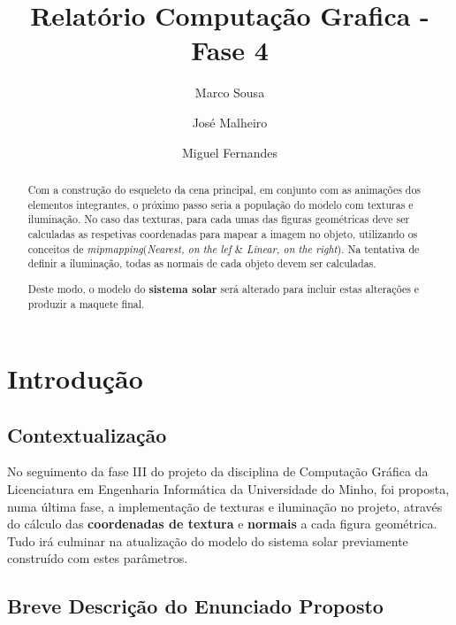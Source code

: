 \documentclass[runningheads]{llncs}
\begin{document}
%
\title{Relatório Computação Grafica - Fase 4}
\author{Marco Sousa \and
    José Malheiro \and
    Miguel Fernandes}
%
%
\maketitle              %
%
\begin{abstract}
    Com a construção do esqueleto da cena principal, em conjunto com as animações
    dos elementos integrantes, o próximo passo seria a população do modelo
    com texturas e iluminação.
    No caso das texturas, para cada umas das figuras geométricas deve ser 
    calculadas as respetivas coordenadas para mapear a imagem no objeto,
    utilizando os conceitos de \textit{mipmapping}(\textit{Nearest, on the lef} 
    \& \textit{Linear, on the right}).
    Na tentativa de definir a iluminação, todas as normais de cada objeto devem 
    ser calculadas.

    Deste modo, o modelo do \textbf{sistema solar} será alterado 
    para incluir estas alterações e produzir a maquete final.
    
    \end{abstract}
    \section{Introdução}
    \subsection{Contextualização}
    No seguimento da fase III do projeto da disciplina de Computação Gráfica 
    da Licenciatura em Engenharia Informática da Universidade do Minho, 
    foi proposta, numa última fase, a implementação de texturas e iluminação no projeto,
    através do cálculo das \textbf{coordenadas de textura} e \textbf{normais}
    a cada figura geométrica. 
    Tudo irá culminar na atualização do modelo do sistema solar
    previamente construído com estes parâmetros.
    
    \subsection{Breve Descrição do Enunciado Proposto}
    
\end{document}
